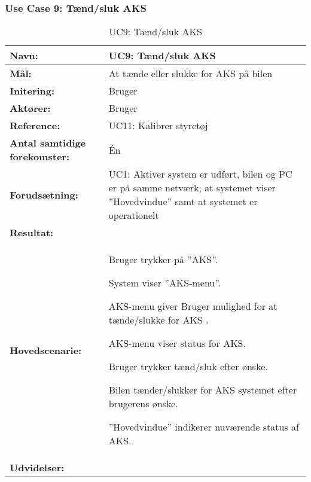 \subsubsection{Use Case 9: Tænd/sluk AKS}
\begin{table}[h]
\begin{tabularx}{\textwidth}{| L{3.3 cm} | Z |} 																			   \hline

\textbf{Navn:} 						& UC9: Tænd/sluk AKS 																	\\ \hline
\textbf{Mål:}						& At tænde eller slukke for AKS på bilen 												\\ \hline
\textbf{Initering:}					& Bruger 																				\\ \hline
\textbf{Aktører:} 					& Bruger 																				\\ \hline  
\textbf{Reference:} 				& UC11: Kalibrer styretøj																\\ \hline
\textbf{Antal samtidige forekomster:} & Én 																					\\ \hline
\textbf{Forudsætning:} 				& UC1: Aktiver system er udført, bilen og PC er på samme netværk, 
									   at systemet viser ''Hovedvindue'' samt at systemet er operationelt					\\ \hline
\textbf{Resultat:}					&  																						\\ \hline
\textbf{Hovedscenarie:}				& 

\begin{packed_enum}
\item Bruger trykker på ''AKS''.
\item System viser ''AKS-menu''.
\item AKS-menu giver Bruger mulighed for at tænde/slukke for AKS .
\item AKS-menu viser status for AKS.
\item Bruger trykker tænd/sluk efter ønske.
\item Bilen tænder/slukker for AKS systemet efter brugerens ønske.
\item ''Hovedvindue'' indikerer nuværende status af AKS.
\end{packed_enum} 																											\\ \hline
\textbf{Udvidelser:}				&  
~
																															\\ \hline
\end{tabularx}
\caption{UC9: Tænd/sluk AKS}
\label{tbl:UC9}
\end{table}